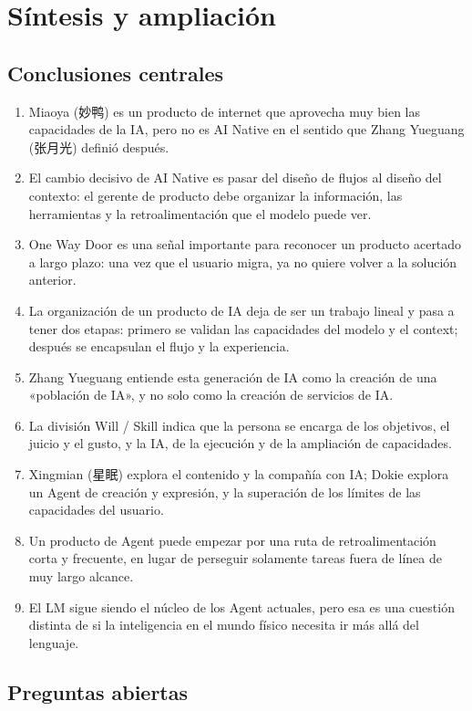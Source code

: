 \documentclass[a4paper]{article}
\begin{document}
\section{Síntesis y ampliación}

\subsection{Conclusiones centrales}

\begin{enumerate}
\item Miaoya (妙鸭) es un producto de internet que aprovecha muy bien las capacidades de la IA, pero no es AI Native en el sentido que Zhang Yueguang (张月光) definió después.
\item El cambio decisivo de AI Native es pasar del diseño de flujos al diseño del contexto: el gerente de producto debe organizar la información, las herramientas y la retroalimentación que el modelo puede ver.
\item One Way Door es una señal importante para reconocer un producto acertado a largo plazo: una vez que el usuario migra, ya no quiere volver a la solución anterior.
\item La organización de un producto de IA deja de ser un trabajo lineal y pasa a tener dos etapas: primero se validan las capacidades del modelo y el context; después se encapsulan el flujo y la experiencia.
\item Zhang Yueguang entiende esta generación de IA como la creación de una «población de IA», y no solo como la creación de servicios de IA.
\item La división Will / Skill indica que la persona se encarga de los objetivos, el juicio y el gusto, y la IA, de la ejecución y de la ampliación de capacidades.
\item Xingmian (星眠) explora el contenido y la compañía con IA; Dokie explora un Agent de creación y expresión, y la superación de los límites de las capacidades del usuario.
\item Un producto de Agent puede empezar por una ruta de retroalimentación corta y frecuente, en lugar de perseguir solamente tareas fuera de línea de muy largo alcance.
\item El LM sigue siendo el núcleo de los Agent actuales, pero esa es una cuestión distinta de si la inteligencia en el mundo físico necesita ir más allá del lenguaje.
\end{enumerate}

\subsection{Preguntas abiertas}
\end{document}

